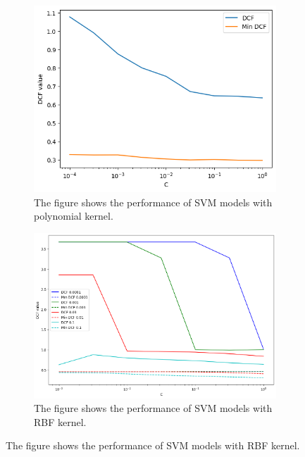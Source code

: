 \documentclass{article}
\begin{document}
\begin{figure}[ht]
    \centering
    \begin{subfigure}[b]{0.45\textwidth}
        \centering
        \includegraphics[width=\textwidth]{images/svm_C_poly.png}
        \caption{The figure shows the performance of SVM models with polynomial kernel.}
        \label{fig:svm_C_poly}
    \end{subfigure}
    \hfill
    \begin{subfigure}[b]{0.45\textwidth}
        \centering
        \includegraphics[width=\textwidth]{images/svm_C_rbf.png}
        \caption{The figure shows the performance of SVM models with RBF kernel.}
        \label{fig:svm_C_rbf}
    \end{subfigure}
\end{figure}
\end{document}
